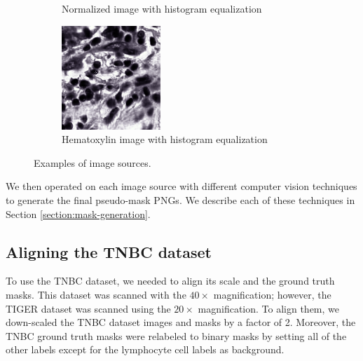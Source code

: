 \begin{figure}[H]
\begin{subfigure}[b]{0.32\textwidth}
    \caption{Normalized image with histogram equalization}\label{fig:tiger-norm-eq}
  \end{subfigure}\hfill
  \begin{subfigure}[b]{0.32\textwidth}
    \centering
    \includegraphics[width=\linewidth]{assets/images/for_presentation/hem_eq_TCGA-EW-A1P8-01Z-00-DX1.E9852193-8CDD-49EF-B49B-DA6931198F0D_[8391, 13690, 8532, 13838].png}
    \caption{Hematoxylin image with histogram equalization}\label{fig:tiger-hem-eq}
  \end{subfigure}
  \caption{Examples of image sources.}
  \label{fig:tiger-sources}
\end{figure}


We then operated on each image source with different computer vision techniques to generate the final pseudo-mask PNGs. We describe each of these techniques in Section \ref{section:mask-generation}. 

\subsection{Aligning the TNBC dataset} 
To use the TNBC dataset, we needed to align its scale and the ground truth masks. This dataset was scanned with the $40\!\times\!$ magnification; however, the TIGER dataset was scanned using the $20\!\times\!$ magnification. To align them, we down-scaled the TNBC dataset images and masks by a factor of 2. Moreover, the TNBC ground truth masks were relabeled to binary masks by setting all of the other labels except for the lymphocyte cell labels as background.

